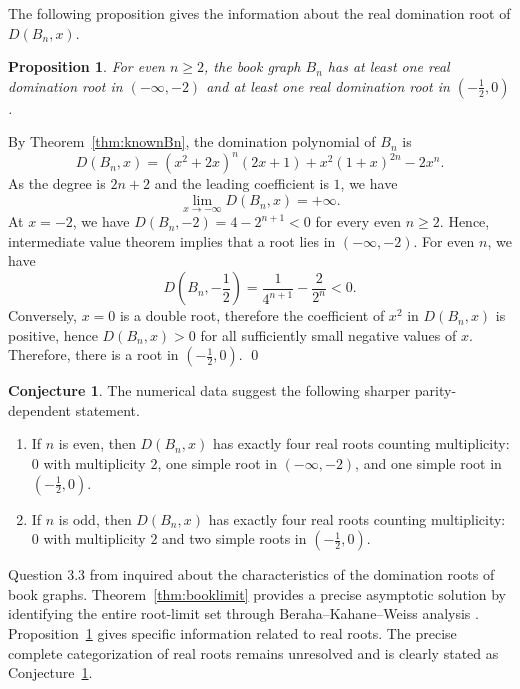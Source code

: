\documentclass[12pt]{article}
\newtheorem{proposition}[theorem]{Proposition}
\theoremstyle{definition}
\newtheorem{conjecture}[theorem]{Conjecture}
\renewenvironment{proof}{{\noindent\bfseries Proof.}}{\qed}
\begin{document}
	The following proposition gives the information about the real domination root of $D(B_n,x).$
	\begin{proposition}
		\label{prop:bookrealexistence}
		For even $n\ge 2$, the book graph $B_n$ has at least one real domination root in $(-\infty,-2)$ and at least one real domination root in $(-\tfrac12,0)$.
	\end{proposition}
	
	\begin{proof}
		By Theorem~\ref{thm:knownBn}, the domination polynomial of $B_{n}$ is 
		$$
		D(B_n,x)=(x^2+2x)^n(2x+1)+x^2(1+x)^{2n}-2x^n.
		$$
		As the degree is $2n+2$ and the leading coefficient is $1$, we have 
			$$
		\lim_{x\to -\infty} D(B_n,x)=+\infty.
		$$
		At $x=-2$, we have $D(B_n,-2)=4-2^{n+1}<0$	for every even $n\ge 2$. Hence, intermediate value theorem implies that a root lies in $(-\infty,-2)$. For even $n$, we have
		$$
		D\left(B_n,-\frac12\right)=\frac{1}{4^{n+1}}-\frac{2}{2^n}<0.
		$$
		 Conversely, $x=0$ is a double root, therefore the coefficient of $x^2$ in $D(B_n,x)$ is positive, hence $D(B_n,x)>0$ for all sufficiently small negative values of $x$. Therefore, there is a root in $(-\tfrac12,0)$.
	\end{proof}
	
	\begin{conjecture}
		\label{conj:bookreal}
		The numerical data suggest the following sharper parity-dependent statement.
		\begin{enumerate}[label=\textup{(\roman*)}]
			\item If $n$ is even, then $D(B_n,x)$ has exactly four real roots counting multiplicity: $0$ with multiplicity $2$, one simple root in $(-\infty,-2)$, and one simple root in $(-\tfrac12,0)$.
			\item If $n$ is odd, then $D(B_n,x)$ has exactly four real roots counting multiplicity: $0$ with multiplicity $2$ and two simple roots in $(-\tfrac12,0)$.
		\end{enumerate}
	\end{conjecture}
	
	 Question 3.3 from \cite{AlikhaniBrownJahari2016} inquired about the characteristics of the domination roots of book graphs. Theorem~\ref{thm:booklimit} provides a precise asymptotic solution by identifying the entire root-limit set through Beraha--Kahane--Weiss analysis \cite{BerahaKahaneWeiss1978}. Proposition~\ref{prop:bookrealexistence} gives specific information related to real roots. The precise complete categorization of real roots remains unresolved and is clearly stated as Conjecture~\ref{conj:bookreal}.
	
\end{document}
